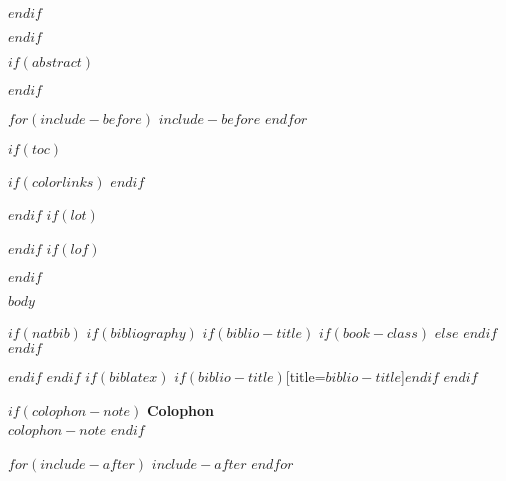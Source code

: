 \documentclass[$if(fontsize)$$fontsize$,$endif$$if(lang)$$lang$,$endif$$if(papersize)$$papersize$,$endif$$for(classoption)$$classoption$$sep$,$endfor$]{$documentclass$}
\begin{document}
\par\vspace*{.35\textheight}{\centering $dedication$ \par}

\clearpage
\normalsize
\newpage

$endif$

\pagestyle{kjh}

\frontmatter
{} 
$endif$

$if(abstract)$
\begin{abstract}
\noindent $abstract$
\end{abstract}
$endif$

$for(include-before)$
$include-before$
$endfor$

$if(toc)$
{
$if(colorlinks)$
\hypersetup{linkcolor=$if(toccolor)$DarkSlateBlue$toccolor$$else$black$endif$}
$endif$
\setcounter{tocdepth}{$toc-depth$}
{\sffamily
\begin{KeepFromToc}  
  \tableofcontents
\end{KeepFromToc}  
}
}
$endif$
$if(lot)$
{\sffamily
  \listoftables
  }
$endif$
$if(lof)$
{\sffamily
  \listoffigures
  }
$endif$


$body$

\twocolumn

$if(natbib)$
$if(bibliography)$
$if(biblio-title)$
$if(book-class)$
\renewcommand\bibname{$biblio-title$}
$else$
\renewcommand\refname{$biblio-title$}
$endif$
$endif$


$endif$
$endif$
$if(biblatex)$
\printbibliography$if(biblio-title)$[title=$biblio-title$]$endif$
$endif$



$if(colophon-note)$
\clearpage
\newpage
\onecolumn
\normalsize
\thispagestyle{empty}
{\sffamily\bfseries\color{pagesectioning} Colophon} \\
\smallskip
$colophon-note$
$endif$

$for(include-after)$
$include-after$
$endfor$
\end{document}
